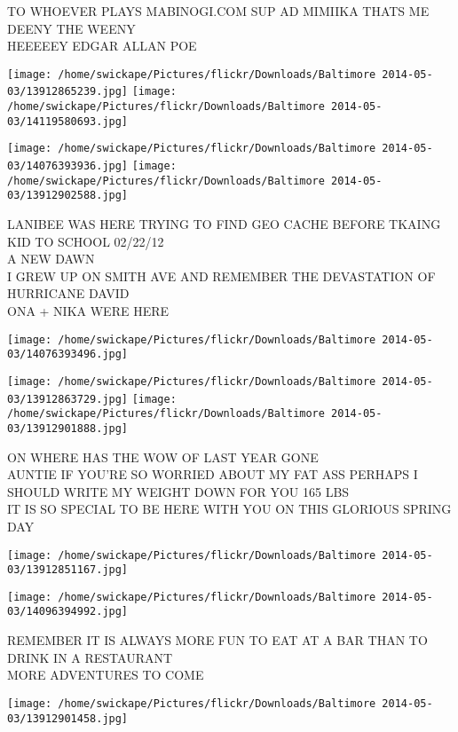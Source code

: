 \documentclass[10pt,letterpaper]{article}
\begin{document}
TO WHOEVER PLAYS MABINOGI.COM SUP AD MIMIIKA THATS ME\\
DEENY THE WEENY\\
HEEEEEY EDGAR ALLAN POE
\pagebreak

\texttt{[image: /home/swickape/Pictures/flickr/Downloads/Baltimore 2014-05-03/13912865239.jpg]}
\texttt{[image: /home/swickape/Pictures/flickr/Downloads/Baltimore 2014-05-03/14119580693.jpg]}

\texttt{[image: /home/swickape/Pictures/flickr/Downloads/Baltimore 2014-05-03/14076393936.jpg]}
\texttt{[image: /home/swickape/Pictures/flickr/Downloads/Baltimore 2014-05-03/13912902588.jpg]}

LANIBEE WAS HERE TRYING TO FIND GEO CACHE BEFORE TKAING KID TO SCHOOL 02/22/12\\
A NEW DAWN\\
I GREW UP ON SMITH AVE AND REMEMBER THE DEVASTATION OF HURRICANE DAVID\\
ONA + NIKA WERE HERE
\pagebreak

\texttt{[image: /home/swickape/Pictures/flickr/Downloads/Baltimore 2014-05-03/14076393496.jpg]}

\vspace{0.25in}
\texttt{[image: /home/swickape/Pictures/flickr/Downloads/Baltimore 2014-05-03/13912863729.jpg]}
\texttt{[image: /home/swickape/Pictures/flickr/Downloads/Baltimore 2014-05-03/13912901888.jpg]}

ON WHERE HAS THE WOW OF LAST YEAR GONE\\
AUNTIE IF YOU'RE SO WORRIED ABOUT MY FAT ASS PERHAPS I SHOULD WRITE MY WEIGHT DOWN  FOR YOU 165 LBS\\
IT IS SO SPECIAL TO BE HERE WITH YOU ON THIS GLORIOUS SPRING DAY
\pagebreak

\texttt{[image: /home/swickape/Pictures/flickr/Downloads/Baltimore 2014-05-03/13912851167.jpg]}

\vspace{0.25in}
\texttt{[image: /home/swickape/Pictures/flickr/Downloads/Baltimore 2014-05-03/14096394992.jpg]}

REMEMBER IT IS ALWAYS MORE FUN TO EAT AT A BAR THAN TO DRINK IN A RESTAURANT\\
MORE ADVENTURES TO COME
\pagebreak

\texttt{[image: /home/swickape/Pictures/flickr/Downloads/Baltimore 2014-05-03/13912901458.jpg]}
\end{document}
